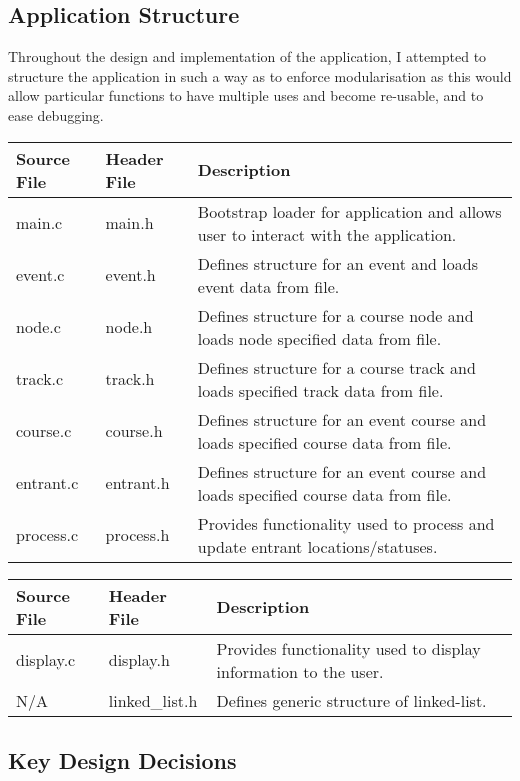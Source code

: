 \documentclass[12pt]{article}
\begin{document}
\subsection{Application Structure}

Throughout the design and implementation of the application, I attempted to structure the application in such a way as to enforce modularisation as this would allow particular functions to have multiple uses and become re-usable, and to ease debugging.\\

\begin{tabular}{| p{1.5cm} | p{1.5cm} | p{8cm} |}
\hline
Source File & Header File & Description \\
\hline
main.c & main.h & Bootstrap loader for application and allows user to interact with the application. \\
\hline
event.c & event.h & Defines structure for an event and loads event data from file. \\
\hline
node.c & node.h & Defines structure for a course node and loads node specified data from file. \\
\hline
track.c & track.h & Defines structure for a course track and loads specified track data from file. \\
\hline
course.c & course.h & Defines structure for an event course and loads specified course data from file. \\
\hline
entrant.c & entrant.h & Defines structure for an event course and loads specified course data from file. \\
\hline
process.c & process.h & Provides functionality used to process and update entrant locations/statuses. \\
\hline

\end{tabular} 

\begin{tabular}{| p{1.5cm} | p{1.5cm} | p{8cm} |}
\hline
Source File & Header File & Description \\
\hline
display.c & display.h & Provides functionality used to display information to the user. \\
\hline
N/A & linked\_list.h & Defines generic structure of linked-list. \\
\hline
\end{tabular}
\subsection{Key Design Decisions}
\end{document}
